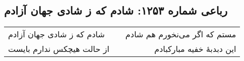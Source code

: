 \begin{center}
\section*{رباعی شماره ۱۲۵۳: شادم که ز شادی جهان آزادم}
\label{sec:1253}
\begin{longtable}{l p{0.5cm} r}
شادم که ز شادی جهان آزادم
&&
مستم که اگر می‌نخورم هم شادم
\\
از حالت هیچکس ندارم بایست
&&
این دبدبهٔ خفیه مبارکبادم
\\
\end{longtable}
\end{center}
